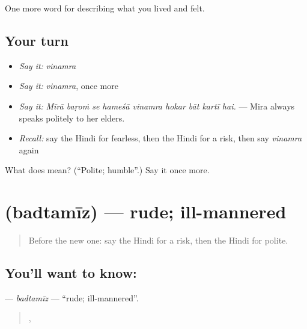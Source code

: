 \begin{grammarlens}[title={What you've built}]
One more word for describing what you lived and felt.
\end{grammarlens}

\subsection*{Your turn}
\begin{itemize}
\raggedright
  \item \emph{Say it:} \emph{vinamra}
  \item \emph{Say it:} \emph{vinamra}, once more
  \item \emph{Say it:} \emph{Mīrā baṛoṁ se hameśā vinamra hokar bāt kartī hai.} — Mira always speaks politely to her elders.
  \item \emph{Recall:} say the Hindi for fearless, then the Hindi for a risk, then say \emph{vinamra} again
\end{itemize}

\begin{tcolorbox}[breakable,colback=teal!4,colframe=teal!35!black,title={Before you move on}]
What does  mean? (\textquotedblleft{}Polite; humble\textquotedblright{}.) Say it once more.
\end{tcolorbox}
\section[\texorpdfstring{\hi{बदतमीज़} (badtamīz)}{बदतमीज़ (badtamīz)}]{ (badtamīz) — rude; ill-mannered}

\label{lesson:HI-C471-badtamiz}



\begin{quote}
Before the new one: say the Hindi for a risk, then the Hindi for polite.
\end{quote}

\subsection*{You'll want to know: }
\textbf{} — \emph{badtamīz} — \textquotedblleft{}rude; ill-mannered\textquotedblright{}.

\begin{quote}
    ,     
\end{quote}

